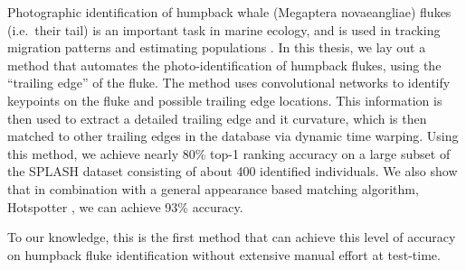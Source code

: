  

Photographic identification of humpback whale (Megaptera novaeangliae) flukes (i.e.\ their tail) is an important task in marine ecology, and is used in tracking migration patterns and estimating populations \cite{blackmer2000temporal} \cite{calambokidis2008splash}.
In this thesis, we lay out a method that automates the photo-identification of humpback flukes, using the ``trailing edge'' of the fluke.
The method uses convolutional networks to identify keypoints on the fluke and possible trailing edge locations.
This information is then used to extract a detailed trailing edge and it curvature, which is then matched to other trailing edges in the database via dynamic time warping.
Using this method, we achieve nearly 80\% top-1 ranking accuracy on a large subset of the SPLASH \cite{calambokidis2008splash} dataset consisting of about 400 identified individuals.
We also show that in combination with a general appearance based matching algorithm, Hotspotter \cite{crall_hotspotter_2013}, we can achieve 93\% accuracy.

To our knowledge, this is the first method that can achieve this level of accuracy on humpback fluke identification without extensive manual effort at test-time.





